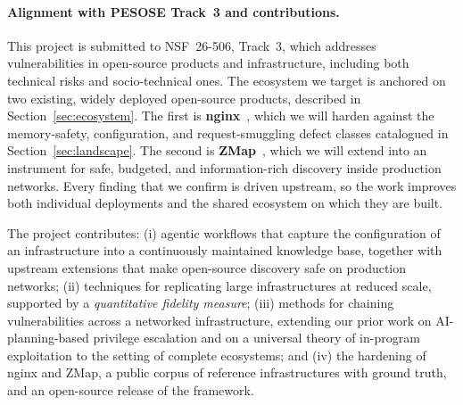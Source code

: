 \paragraph{Alignment with PESOSE Track~3 and contributions.}
This project is submitted to NSF~26-506, Track~3, which addresses
vulnerabilities in open-source products and infrastructure, including both
technical risks and socio-technical ones. The ecosystem we target is anchored on two existing, widely deployed open-source products, described in Section~\ref{sec:ecosystem}. The first is \textbf{nginx}~\cite{nginx,nginxsrc}, which we will harden against the memory-safety, configuration, and request-smuggling defect classes catalogued in Section~\ref{sec:landscape}. The second is \textbf{ZMap}~\cite{zmap,zmapsrc}, which we will extend into an instrument for safe, budgeted, and information-rich discovery inside production networks. Every finding that we confirm is driven upstream, so the work improves both
individual deployments and the shared ecosystem on which they are built.

The project contributes: (i) agentic workflows that capture the configuration
of an infrastructure into a continuously maintained knowledge base, together
with upstream extensions that make open-source discovery safe on production
networks; (ii) techniques for replicating large infrastructures at reduced
scale, supported by a \emph{quantitative fidelity measure}; (iii) methods for
chaining vulnerabilities across a networked infrastructure, extending our
prior work on AI-planning-based privilege escalation and on a universal
theory of in-program exploitation to the setting of complete ecosystems; and
(iv) the hardening of nginx and ZMap, a public corpus of reference
infrastructures with ground truth, and an open-source release of the
framework.
